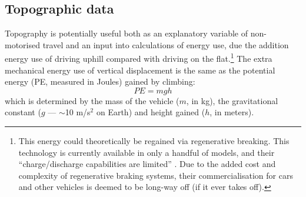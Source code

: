 \documentclass[a4paper, 11pt, twoside]{Thesis}
\begin{document}
\subsection{Topographic data}
Topography is potentially useful both as an explanatory variable of
non-motorised travel and an input into calculations of energy use, due the
addition energy use of driving
uphill compared with driving on the flat.\footnote{This
energy could theoretically
be regained via regenerative breaking. This technology is currently available
in  only a handful of models, and their ``charge/discharge capabilities are
limited'' \citep{Clarke2010}. Due to the added cost and complexity of
regenerative braking systems, their commercialisation for cars and other
vehicles is deemed to be long-way off (if it ever takes off).
}
The extra mechanical energy use of vertical displacement is the same as the
potential energy (PE, measured in Joules) gained by climbing:
\begin{equation}
 PE = mgh
\end{equation}
which is determined by the mass of the vehicle ($m$, in kg), the gravitational
constant ($g$ --- $\sim$10 m/s$^2$ on Earth) and height gained ($h$, in meters).
\end{document}
